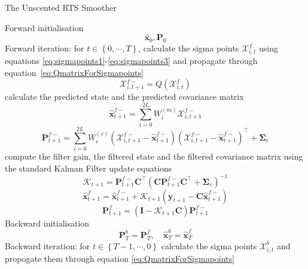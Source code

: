 \documentclass[12pt]{iopart}
\begin{document}
\begin{algorithm}
	\begin{small}
	\caption{The Unscented RTS Smoother}\label{UKFAlgorithm} 
	\begin{algorithmic}[1] 
		\State Forward initialisation 
		\begin{equation*}
		 \hat{\mathbf x}_0, \mathbf P_0 
		\end{equation*}
		\State Forward iteration: for $t \in \left\lbrace 0,\cdots, T\right\rbrace $,
		calculate the sigma points $\mathcal X_{i,t}^f$ using equations \ref{eq:sigmapoints1}-\ref{eq:sigmapoints3} and propagate through equation~\ref{eq:QmatrixForSigmapoints}
		\begin{equation*}
			\mathcal X_{i,t+1}^{f-}=Q(\mathcal X_{i,t}^f) 
		\end{equation*}
		calculate the predicted state and the predicted covariance matrix
		\begin{equation*}
			\hat{\mathbf x}_{t+1}^{f-}=\sum_{i=0}^{2L} W_i^{(m)}\mathcal X_{i,t+1}^{f-} 
		\end{equation*}
		\begin{equation*}
			\mathbf P_{t +1}^{f-}=\sum_{i=0}^{2L} W_i^{(c)}(\mathcal X_{i,t+1}^{f-}-\hat{\mathbf x}_{t +1}^{f-})(\mathcal X_{i,t+1}^{f-}-\hat{\mathbf x}_{t +1}^{f-})^\top+\boldsymbol \Sigma_e 
		\end{equation*}
		compute the filter gain, the filtered state and the filtered covariance matrix using the standard Kalman Filter update equations
		\begin{equation*}
			\mathcal K_{t+1}=\mathbf P_{t +1}^{f-}\mathbf C ^\top(\mathbf C \mathbf P_{t +1}^{f-}\mathbf C ^\top+\boldsymbol \Sigma_v)^{-1} 
		\end{equation*}
		\begin{equation*}
			\hat{\mathbf x}_{t+1}^{f}=\hat{\mathbf x}_{t+1}^{f-}+\mathcal K_{t+1}(\mathbf y_{t+1}-\mathbf C\hat{\mathbf x}_{t +1}^{f-}) 
		\end{equation*}
		\begin{equation*}
			\mathbf P_{t+1}^f=(\mathbf I - \mathcal K_{t+1}\mathbf C)\mathbf P_{t +1}^{f-} 
		\end{equation*}
		\State Backward initialisation 
		\begin{equation*}
			\mathbf P_T^b= \mathbf P_T^f, \quad \hat{\mathbf x}^b_T= \hat{\mathbf x}^f_T 
		\end{equation*}
		\State Backward iteration: for $t \in \left\lbrace T-1, \cdots, 0 \right\rbrace $ calculate the sigma points $\mathcal X_{i,t}^b$ and propogate them through equation \ref{eq:QmatrixForSigmapoints}

\end{algorithmic}
\end{small}
\end{algorithm}
\end{document}
